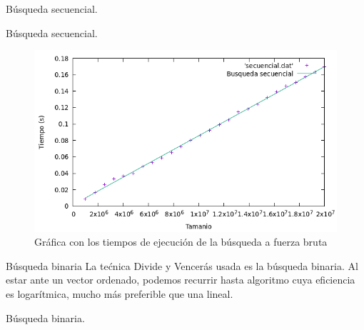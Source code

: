 \documentclass[10pt, xcolor=table]{beamer}
\begin{document}
\begin{frame}[fragile]{Búsqueda secuencial. }
	\begin{table}[h!]
		\centering
		\footnotesize
		\caption{Experiencia empírica de la búsqueda a fuerza bruta}
	\end{table}
\end{frame}

\begin{frame}[fragile]{Búsqueda secuencial. }
\begin{figure}[h!]
	\centering
	\includegraphics[scale=0.45]{./Images/Grafica_secuencial.png}
	\caption{Gráfica con los tiempos de ejecución de la búsqueda a fuerza bruta}
\end{figure}
\end{frame}

\begin{frame}[fragile]{Búsqueda binaria}
La tećnica Divide y Vencerás usada es la búsqueda binaria. Al estar ante un vector ordenado, podemos recurrir hasta algoritmo cuya eficiencia es logarítmica, mucho más preferible que una lineal.
\end{frame}

\begin{frame}[fragile]{Búsqueda binaria. }

\end{frame}
\end{document}

